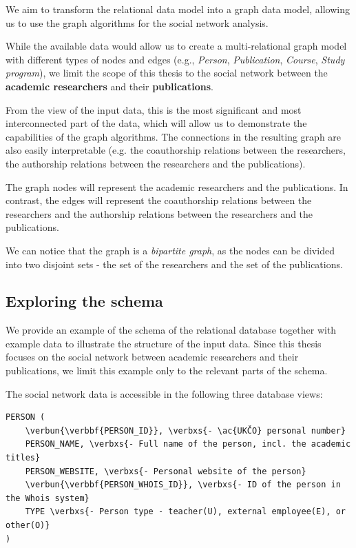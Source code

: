 We aim to transform the relational data model into a graph data model, allowing us to use the graph algorithms for the social network analysis.

While the available data would allow us to create a multi-relational graph model with different types of nodes and edges (e.g., \textit{Person}, \textit{Publication}, \textit{Course}, \textit{Study program}), 
we limit the scope of this thesis to the social network between the \textbf{academic researchers} and their \textbf{publications}.

From the view of the input data, this is the most significant and most interconnected part of the data, which will allow us to demonstrate the capabilities of the graph algorithms.
The connections in the resulting graph are also easily interpretable (e.g. the coauthorship relations between the researchers, the authorship relations between the researchers and the publications).

The graph nodes will represent the academic researchers and the publications. In contrast, the edges will represent the coauthorship relations between the researchers and the authorship relations between the researchers and the publications.

We can notice that the graph is a \textit{bipartite graph}, as the nodes can be divided into two disjoint sets - the set of the researchers and the set of the publications.

\subsection{Exploring the schema}

We provide an example of the schema of the relational database together with example data to illustrate the structure of the input data.
Since this thesis focuses on the social network between academic researchers and their publications, we limit this example only to the relevant parts of the schema.

The social network data is accessible in the following three database views:

\begin{Verbatim}[commandchars=\\\{\}]
PERSON (
    \verbun{\verbbf{PERSON_ID}}, \verbxs{- \ac{UKČO} personal number}
    PERSON_NAME, \verbxs{- Full name of the person, incl. the academic titles}
    PERSON_WEBSITE, \verbxs{- Personal website of the person}
    \verbun{\verbbf{PERSON_WHOIS_ID}}, \verbxs{- ID of the person in the Whois system}
    TYPE \verbxs{- Person type - teacher(U), external employee(E), or other(O)}
)
\end{Verbatim}

